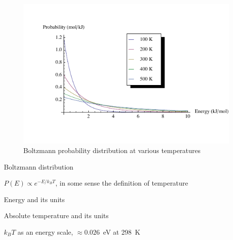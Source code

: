 \message{ !name(Outline.tex)}\documentclass[11pt]{article}
\begin{document}
\begin{outline}
\begin{outline}
\begin{figure}
\begin{center}
\includegraphics[scale=1.25]{Images/Boltzmann.pdf}
\caption{Boltzmann probability distribution at various temperatures}
\end{center}
\end{figure}

\item{Boltzmann distribution}
    \begin{outline}
    \item $P(E) \propto e^{-E/k_BT}$, in some sense the definition of temperature
    \item Energy and its units
    \item Absolute temperature and its units
    \item $k_BT$ as an energy scale, $\approx 0.026$~eV at 298~K


\end{outline}
\end{outline}
\end{outline}
\end{document}
